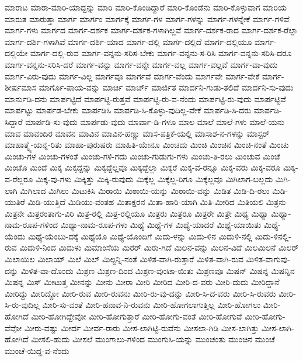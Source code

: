 {ಮಾರಾಟ
ಮಾರಾ-ಮಾರಿ-ಯಾದ್ದನ್ನು
ಮಾರಿ
ಮಾರಿ-ಕೊಂಡಿದ್ದಾರೆ
ಮಾರಿ-ಕೊಂಡೆನು
ಮಾರಿ-ಕೊಳ್ಳುವಾಗ
ಮಾರಿಯ
ಮಾರುತ
ಮಾರುತ್ತಾ
ಮಾರ್ಗ
ಮಾರ್ಗಂ
ಮಾರ್ಗಕ್ಕೆ
ಮಾರ್ಗ-ಗಳ
ಮಾರ್ಗ-ಗಳನ್ನು
ಮಾರ್ಗ-ಗಳನ್ನೇಕೆ
ಮಾರ್ಗ-ಗಳಿವೆ
ಮಾರ್ಗ-ಗಳು
ಮಾರ್ಗದ
ಮಾರ್ಗ-ದರ್ಶಕ
ಮಾರ್ಗ-ದರ್ಶಕ-ಗಳಾಗಿಲ್ಲವೆ
ಮಾರ್ಗ-ದರ್ಶಕ-ರಾದ
ಮಾರ್ಗ-ದರ್ಶಕ-ರೆಲ್ಲಾ
ಮಾರ್ಗ-ದರ್ಶಿ-ಗಳಾಗಿವೆ
ಮಾರ್ಗ-ದರ್ಶಿ-ಯಾದ
ಮಾರ್ಗ-ದಲ್ಲಿ
ಮಾರ್ಗ-ದಲ್ಲಿದೆ
ಮಾರ್ಗ-ದಲ್ಲಿಯೂ
ಮಾರ್ಗ-ದಲ್ಲಿಯೇ
ಮಾರ್ಗ-ದಲ್ಲಿ-ರುವ
ಮಾರ್ಗ-ವನ್ನನು-ಸರಿಸ-ಬೇಕು
ಮಾರ್ಗ-ವನ್ನನು-ಸ-ರಿಸಿ
ಮಾರ್ಗ-ವನ್ನನು-ಸರಿಸಿ-ದರೂ
ಮಾರ್ಗ-ವನ್ನನು-ಸರಿಸಿ-ದರೆ
ಮಾರ್ಗ-ವನ್ನು
ಮಾರ್ಗ-ವನ್ನೇ
ಮಾರ್ಗ-ವಲ್ಲ
ಮಾರ್ಗ-ವಲ್ಲವೆ
ಮಾರ್ಗ-ವಾ-ವುದು
ಮಾರ್ಗ-ವಿರು-ವುದು
ಮಾರ್ಗ-ವಿಲ್ಲ
ಮಾರ್ಗವೂ
ಮಾರ್ಗವೆ
ಮಾರ್ಗ-ವೆಂದು
ಮಾರ್ಗವೇ
ಮಾರ್ಗ-ವೇಕೆ
ಮಾರ್ಗ-ಶೀರ್ಷಮಾಸ
ಮಾರ್ಗೊ-ಪಾಯ-ವನ್ನು
ಮಾರ್ಚಿ
ಮಾರ್ಚ್
ಮಾರ್ಜಿತ
ಮಾರ್ದನಿ-ಗುಡು-ತಲಿದೆ
ಮಾರ್ದನಿ-ಸು-ವುದು
ಮಾರ್ನುಡಿ-ದನು
ಮಾರ್ಪಟ್ಟಿದೆ
ಮಾರ್ಪಟ್ಟಿ-ರುತ್ತವೆ
ಮಾರ್ಪಟ್ಟಿ-ರು-ವ-ನೆಂದು
ಮಾರ್ಪಟ್ಟಿ-ರು-ವುದು
ಮಾರ್ಪಟ್ಟಿವೆ
ಮಾರ್ಪಟ್ಟು
ಮಾರ್ಪಡ-ಬೇಕು
ಮಾರ್ಪಡಿಸಿ
ಮಾರ್ಪಡಿ-ಸಿ-ಕೊಳ್ಳು-ವುದಿಲ್ಲ-ವೇಕೆ
ಮಾರ್ಪಡಿ-ಸಿ-ದರು
ಮಾರ್ಪಡಿ-ಸಿದ್ದಾರೆ
ಮಾರ್ಪಡಿ-ಸು-ವುದು
ಮಾರ್ಪಡು-ವುದು
ಮಾರ್ವಾ-ಡಿ-ಗಳೂ
ಮಾಲ
ಮಾಲೆ
ಮಾಲೆ-ಗಳು
ಮಾಲೆ-ಯನು
ಮಾವ
ಮಾವಂದಿರ
ಮಾವನ
ಮಾವಿನ
ಮಾವಿನ-ಹಣ್ಣು
ಮಾಸ-ಪತ್ರಿಕೆ-ಯಲ್ಲಿ
ಮಾಸಾಶ-ನ-ಗಳನ್ನು
ಮಾಸ್ಟರ್
ಮಾಹಾತ್ಮ್ಯೆ-ಯನ್ನ-ರಿತು
ಮಾಹಾ-ಪುರುಷರು
ಮಾಹಿತಿ-ಯೇನೂ
ಮಿಂಚದು
ಮಿಂಚಿ
ಮಿಂಚಿನ
ಮಿಂಚಿ-ನಂತೆ
ಮಿಂಚು
ಮಿಂಚು-ಗಳ
ಮಿಂಚು-ಗಳಂತೆ
ಮಿಂಚು-ಗಳಿ-ಗದು
ಮಿಂಚು-ಗುಡುಗು-ಗಳು
ಮಿಂಚು-ತಿ-ರಲು
ಮಿಂಚುವ
ಮಿಂಚೆ
ಮಿಂಚೊ
ಮಿಂದೆ
ಮಿಕ್ಕ
ಮಿಕ್ಕದ್ದನ್ನು
ಮಿಕ್ಕದ್ದೆಲ್ಲವೂ
ಮಿಕ್ಕದ್ದೆಲ್ಲಾ
ಮಿಕ್ಕರೆ
ಮಿಕ್ಕ-ವ-ರನ್ನೂ
ಮಿಕ್ಕ-ವರು
ಮಿಕ್ಕ-ವರೂ
ಮಿಕ್ಕ-ವ-ರೆಲ್ಲರೂ
ಮಿಕ್ಕ-ವು-ಗಳು
ಮಿಕ್ಕಿತ್ತು
ಮಿಕ್ಕಿ-ರುವುದು
ಮಿಕ್ಕೆಲ್ಲ
ಮಿಕ್ಕೆಲ್ಲ-ರಿಗೂ
ಮಿಕ್ಕೆಲ್ಲವೂ
ಮಿಗಿಲಾಗ-ಬಲ್ಲದು
ಮಿಗಿ-ಲಾಗಿ
ಮಿಗಿಲಾದ
ಮಿಗಿಲು
ಮಿಟುಕಿಸಿ
ಮಿಠಾಯಿ
ಮಿಠಾಯಿ-ಯನ್ನು
ಮಿಠಾಯಿ-ವನ್ನು
ಮಿಡಿತ
ಮಿಡಿ-ದಿ-ರಲು
ಮಿಡಿ-ಯುತಿರೆ
ಮಿಡಿ-ಯುತ್ತಿದೆ
ಮಿಡಿಯು-ವಂತಹ
ಮಿತಾಕ್ಷರನ
ಮಿತಾ-ಹಾರಿ-ಯಾಗಿ
ಮಿತಿ-ಮೀರಿದ
ಮಿತಿಯಲಿ
ಮಿತ್ರನು
ಮಿತ್ರನೇ
ಮಿತ್ರರಂತಾಗು-ವಿರಿ
ಮಿತ್ರ-ರಲ್ಲಿ
ಮಿತ್ರ-ರಲ್ಲಿಯೂ
ಮಿತ್ರರು
ಮಿತ್ರರೂ
ಮಿತ್ರರೇ
ಮಿತ್ರೇ
ಮಿಥ್ಯ
ಮಿಥ್ಯಾ
ಮಿಥ್ಯಾ-ನಾಮ-ರೂಪ-ಗಳಿಂದ
ಮಿಥ್ಯಾ-ನಾಮ-ರೂಪ-ಗಳು
ಮಿಥ್ಯೆ
ಮಿಥ್ಯೆ-ಗಳ
ಮಿಥ್ಯೆ-ಯಾದರೆ
ಮಿಥ್ಯೆ-ಯಾಯಿತು
ಮಿಥ್ಯೆ-ಯೆಂದು
ಮಿಥ್ಯೆ-ಯೆಂಬು-ದಕ್ಕೆ
ಮಿಥ್ಯೆಯೊ
ಮಿಥ್ಯೆ-ಯೊಂದಿಗೆ
ಮಿದು-ಳನ್ನು
ಮಿದು-ಳಿನ
ಮಿದುಳಿ-ನಲ್ಲಿ
ಮಿದು-ಳಿನಲ್ಲಿ-ರುವ
ಮಿದುಳಿ-ನಿಂದ
ಮಿದುಳು
ಮಿಮಾಂಸೆಯ
ಮಿರರ್
ಮಿರು-ಗಿದೆ
ಮಿಲನ-ವನ್ನು
ಮಿಲನ-ವಿದೆ
ಮಿಲಮಿಲನೆ
ಮಿಲರ್
ಮಿಲಾಯಿಲ
ಮಿಲಾಯ್
ಮಿಲೆ
ಮಿಲ್
ಮಿಲ್ಟನ್ನಿ-ನಂತೆ
ಮಿಳಿತ-ವಾಗಿ-ರುತ್ತಾರೆ
ಮಿಳಿತ-ವಾಗಿ-ರುವ
ಮಿಳಿತ-ವಾಗುವು-ದನ್ನು
ಮಿಳಿತ-ವಾ-ದೊಂದು
ಮಿಶ್ರಣ
ಮಿಶ್ರಣ-ದಿಂದ
ಮಿಶ್ರಣ-ವುಂಟಾ-ಯಿತು
ಮಿಶ್ರಣವೂ
ಮಿಷನ್
ಮಿಷನ್ನ
ಮಿಷನ್ನಿನ
ಮಿಷನ್ನ
ಮಿಸ್
ಮೀಟುತ್ತ
ಮೀನನ್ನು
ಮೀನು
ಮೀರಾ
ಮೀರಿ
ಮೀರಿದ
ಮೀರಿ-ದ-ವರು
ಮೀರಿ-ದುದು
ಮೀರಿದ್ದಾನೆ
ಮೀರಿದ್ದು
ಮೀರಿದ್ದೋ
ಮೀರಿ-ರುವ
ಮೀರಿ-ರುವನು
ಮೀರಿ-ರು-ವು-ದನ್ನು
ಮೀರಿ-ಸಿ-ದ-ವರು
ಮೀರಿ-ಸಿ-ರುವರು
ಮೀರಿ-ಸಿ-ರು-ವುದಿಲ್ಲ
ಮೀರಿ-ಸು-ವಂತೆ
ಮೀರಿ-ಹನಾವ-ನಿ-ರುವನು
ಮೀರಿ-ಹೋಗಲಾಗುತ್ತಿಲ್ಲ
ಮೀರಿ-ಹೋಗಲು
ಮೀರಿ-ಹೋಗಿದೆ
ಮೀರಿ-ಹೋಗಿದ್ದೇವೋ
ಮೀರಿ-ಹೋಗುತ್ತಾರೆ
ಮೀರಿ-ಹೋಗು-ವಂತೆ
ಮೀರಿ-ಹೋಗುವೆ
ಮೀರಿ-ಹೋಗು-ವೆವೋ
ಮೀರು-ವಷ್ಟು
ಮೀರ್ದ
ಮೀರ್ವ-ರಾರು
ಮೀಸ-ಲಾಗಿಟ್ಟಿ-ರುವೆನು
ಮೀಸಲಾ-ಗಿಡಿ
ಮೀಸ-ಲಾಗಿತ್ತು
ಮೀಸ-ಲಾಗಿ-ಹೋಗಿದೆ
ಮೀಸಲಿ-ಹುದು
ಮೀಸಲೆ
ಮುಂಗಾಲು-ಗಳಿಂದ
ಮುಂಗುಸಿ-ಯನ್ನು
ಮುಂಚಂತು
ಮುಂಚಿನ
ಮುಂಚೆ
ಮುಂಚೆ-ಯಿದ್ದ-ವ-ನೆಂದು
}
